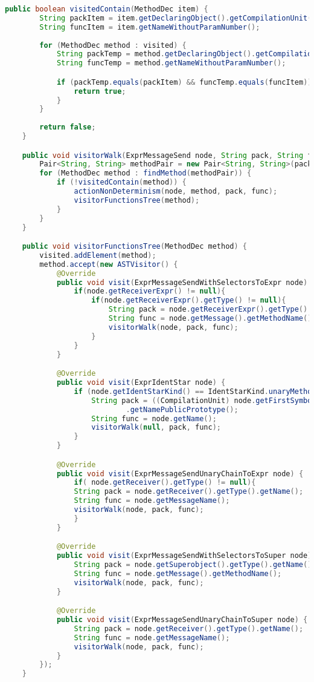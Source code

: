 \begin{lstlisting}[basicstyle=\tiny, language=Java, caption={Código Fonte de \textbf{CyanMetaobjectTreplicaAction}}, label={cod:MetaActionFonte}]
	public boolean visitedContain(MethodDec item) {
		String packItem = item.getDeclaringObject().getCompilationUnit().getNamePublicPrototype();
		String funcItem = item.getNameWithoutParamNumber();
		
        for (MethodDec method : visited) {
			String packTemp = method.getDeclaringObject().getCompilationUnit().getNamePublicPrototype();
			String funcTemp = method.getNameWithoutParamNumber();

			if (packTemp.equals(packItem) && funcTemp.equals(funcItem)) {
				return true;
			}
		}
        
		return false;
	}

	public void visitorWalk(ExprMessageSend node, String pack, String func) {
		Pair<String, String> methodPair = new Pair<String, String>(pack, func);
		for (MethodDec method : findMethod(methodPair)) {
			if (!visitedContain(method)) {
				actionNonDeterminism(node, method, pack, func);
				visitorFunctionsTree(method);
			}
		}
	}

	public void visitorFunctionsTree(MethodDec method) {
		visited.addElement(method);
		method.accept(new ASTVisitor() {
			@Override
			public void visit(ExprMessageSendWithSelectorsToExpr node) {
				if(node.getReceiverExpr() != null){
					if(node.getReceiverExpr().getType() != null){
						String pack = node.getReceiverExpr().getType().getName();
						String func = node.getMessage().getMethodName();
						visitorWalk(node, pack, func);
					}
				}
			}

			@Override
			public void visit(ExprIdentStar node) {
				if (node.getIdentStarKind() == IdentStarKind.unaryMethod_t) {
					String pack = ((CompilationUnit) node.getFirstSymbol().getCompilationUnit())
							.getNamePublicPrototype();
					String func = node.getName();
					visitorWalk(null, pack, func);
				}
			}

			@Override
			public void visit(ExprMessageSendUnaryChainToExpr node) {
				if( node.getReceiver().getType() != null){
				String pack = node.getReceiver().getType().getName();
				String func = node.getMessageName();
				visitorWalk(node, pack, func);
				}
			}

			@Override
			public void visit(ExprMessageSendWithSelectorsToSuper node) {
				String pack = node.getSuperobject().getType().getName();
				String func = node.getMessage().getMethodName();
				visitorWalk(node, pack, func);
			}

			@Override
			public void visit(ExprMessageSendUnaryChainToSuper node) {
				String pack = node.getReceiver().getType().getName();
				String func = node.getMessageName();
				visitorWalk(node, pack, func);
			}
		});
	}


\end{lstlisting}
